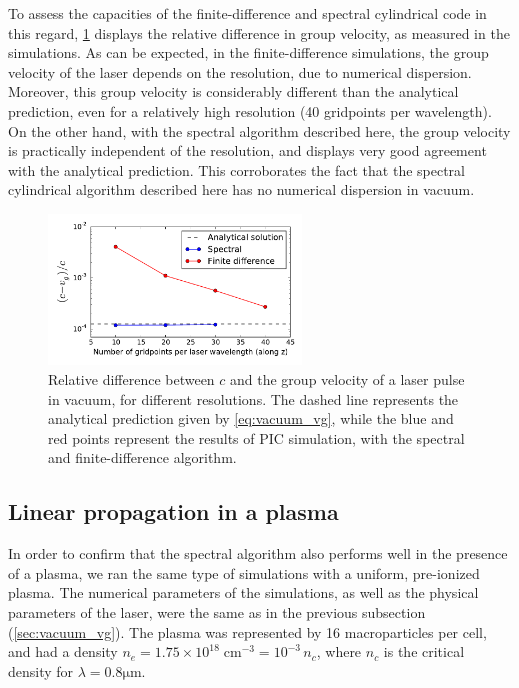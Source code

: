 \documentclass[a4paper]{article}   	%
\begin{document}
To assess the capacities of the finite-difference and
spectral cylindrical code in this regard, \cref{fig:Vacuum_vg} displays the relative
difference in group velocity, as measured in the
simulations. As can be expected, in the
finite-difference simulations, the
group velocity of the laser depends on the resolution, due to numerical
dispersion. 
Moreover, this group velocity is considerably different than the analytical
prediction, even for a relatively high resolution (40 gridpoints per
wavelength). On the other hand, with the spectral algorithm described
here, the group velocity is practically independent of the resolution, and
displays very good agreement with the analytical prediction. 
This corroborates the fact that the spectral cylindrical algorithm
described here has no numerical dispersion in vacuum.

\begin{figure}[!h]
\centering
\includegraphics[width=0.6\textwidth]{figures/Vacuum_vg.pdf}
\caption{\label{fig:Vacuum_vg}Relative difference between $c$ and the
group velocity of a laser pulse in vacuum, for different resolutions. The dashed line represents
the analytical prediction given by \cref{eq:vacuum_vg}, while the blue
and red points represent the results of PIC simulation, with the
spectral and finite-difference algorithm.}
\end{figure}


\subsection{Linear propagation in a plasma}

In order to confirm that the spectral algorithm also performs well in
the presence of a plasma, we ran the same type of simulations with a
uniform, pre-ionized plasma. The numerical parameters of the
simulations, as well as the physical parameters of the laser, 
were the same as in the previous subsection
(\cref{sec:vacuum_vg}). The plasma was represented by 16
macroparticles per cell, and had a density $n_e = 1.75\times
10^{18}\;\mathrm{cm}^{-3} = 10^{-3}\,n_c$, where $n_c$ is the critical
density for $\lambda=0.8\mathrm{\mu m}$.
\end{document}
